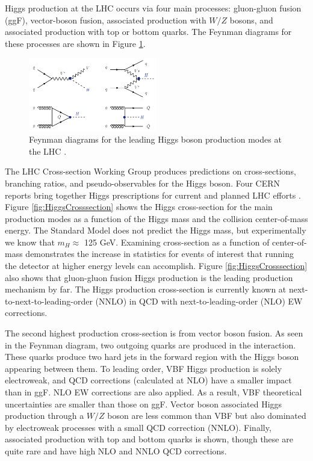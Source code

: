 Higgs production at the LHC occurs via four main processes: gluon-gluon fusion (ggF), vector-boson fusion, associated production with $W/Z$ bosons, and associated production with top or bottom quarks. The Feynman diagrams for these processes are shown in Figure \ref{fig:FeynmannHiggs}.  

\begin{figure}[H]
        \centering
    \includegraphics[width=0.5\textwidth] {Pictures/FeynmannHiggs.png}\hspace{1cm}
    \caption{Feynman diagrams for the leading Higgs boson production modes at the LHC \cite{Djouadi}.}
    \label{fig:FeynmannHiggs}
\end{figure}

The LHC Cross-section Working Group produces predictions on cross-sections, branching ratios, and pseudo-observables for the Higgs boson. Four CERN reports bring together Higgs prescriptions for current and planned LHC efforts \cite{LHCCrossSectionWG}. Figure \ref{fig:HiggsCrosssection} shows the Higgs cross-section for the main production modes as a function of the Higgs mass and the collision center-of-mass energy. The Standard Model does not predict the Higgs mass, but experimentally we know that $m_H\approx$ 125 GeV. Examining cross-section as a function of center-of-mass demonstrates the increase in statistics for events of interest that running the detector at higher energy levels can accomplish. Figure \ref{fig:HiggsCrosssection} also shows that gluon-gluon fusion Higgs production is the leading production mechanism by far. The Higgs production cross-section is currently known at next-to-next-to-leading-order (NNLO) in QCD with next-to-leading-order (NLO) EW corrections. 

The second highest production cross-section is from vector boson fusion. As seen in the Feynman diagram, two outgoing quarks are produced in the interaction. These quarks produce two hard jets in the forward region with the Higgs boson appearing between them. To leading order, VBF Higgs production is solely electroweak, and QCD corrections (calculated at NLO) have a smaller impact than in ggF. NLO EW corrections are also applied. As a result, VBF theoretical uncertainties are smaller than those on ggF. Vector boson associated Higgs production through a $W/Z$ boson are less common than VBF but also dominated by electroweak processes with a small QCD correction (NNLO). Finally, associated production with top and bottom quarks is shown, though these are quite rare and have high NLO and NNLO QCD corrections. 


